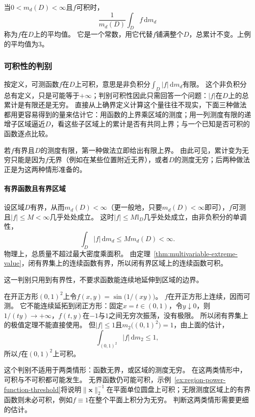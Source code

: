 当$0<m_d(D)<\infty$且$f$可积时，
\[
 \frac{1}{m_d(D)}\int_Df\,\mathrm dm_d
\]
称为$f$在$D$上的平均值。
它是一个常数，用它代替$f$铺满整个$D$，总累计不变。上例的平均值为$3$。

\subsubsection{可积性的判别}

按定义，可测函数$f$在$D$上可积，意思是非负积分$\int_D|f|\,\mathrm dm_d$有限。
这个非负积分总有定义，只是可能等于$+\infty$；判别可积性因此只需回答一个问题：$|f|$在$D$上的总累计是有限还是无穷。
直接从上确界定义计算这个量往往不现实，下面三种做法都用更容易得到的量来估计它：用函数的上界乘区域的测度；用一列测度有限的递增子区域逼近$D$，看这些子区域上的累计是否有共同上界；与一个已知是否可积的函数逐点比较。

若$f$有界且$D$的测度有限，第一种做法立即给出有限上界。
由此可见，累计变为无穷只能是因为$f$无界（例如在某些位置附近无界），或者$D$的测度无穷；后两种做法正是为这两种情形准备的。

\paragraph{有界函数且有界区域}

设区域$D$有界，从而$m_d(D)<\infty$（更一般地，只要$m_d(D)<\infty$即可），$f$可测且$|f|\leq M<\infty$几乎处处成立。
这时$|f|\leq M\mathbb I_D$几乎处处成立，由非负积分的单调性，
\[
 \int_D|f|\,\mathrm dm_d\leq M m_d(D)<\infty.
\]
物理上，总质量不超过最大密度乘面积。
由定理~\ref{thm:multivariable-extreme-value}，闭有界集上的连续函数有界，所以闭有界区域上的连续函数可积。

这一判别只用到有界性，不要求函数能连续地延伸到区域的边界。
\begin{example}[开正方形上剧烈振荡的有界函数可积]
\label{ex:region-bounded-oscillation}
在开正方形$(0,1)^2$上令$f(x,y)=\sin\bigl(1/(xy)\bigr)$。
$f$在开正方形上连续，因而可测。
它不能连续延拓到闭正方形：固定$x=t\in(0,1)$，令$y\downarrow0$，则$1/(ty)\to+\infty$，$f(t,y)$在$-1$与$1$之间无穷次振荡，没有极限。
所以闭有界集上的极值定理不能直接使用。
但$|f|\leq1$且$m_2\bigl((0,1)^2\bigr)=1$，由上面的估计，
\[
 \int_{(0,1)^2}|f|\,\mathrm dm_2\leq1,
\]
所以$f$在$(0,1)^2$上可积。
\end{example}

这个判别不适用于两类情形：函数无界，或区域的测度无穷。
在这两类情形中，可积与不可积都可能发生。
无界函数仍可能可积，示例~\ref{ex:region-power-function-threshold}将说明$\lVert\bm x\rVert_2^{-1}$在平面单位圆盘上可积；无限测度区域上的有界函数则未必可积，例如$f\equiv1$在整个平面上积分为无穷。
判断这两类情形需要更细的估计。

